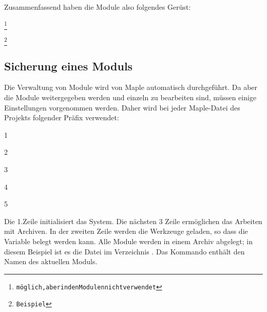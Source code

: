 Zusammenfassend haben die Module also folgendes Gerüst:
 
\begin{alltt} 
 	
 		
 		
     \footnote{möglich, aber in den Modulen nicht verwendet}
 	           
 		

    
     \footnote{Beispiel }
 		


		
		
 		
\end{alltt}


\newpage
\subsection{Sicherung eines Moduls}

Die Verwaltung von Module wird von Maple automatisch durchgeführt. Da aber die Module weitergegeben werden und einzeln zu bearbeiten sind, müssen einige  Einstellungen vorgenommen werden. Daher wird bei jeder Maple-Datei des Projekts folgender Präfix verwendet:

1 

2 

3 

4 

5 


Die 1.Zeile initialisiert das System. Die nächsten 3 Zeile ermöglichen das Arbeiten mit Archiven. In der zweiten Zeile werden die Werkzeuge geladen, so dass die Variable  belegt werden kann. Alle Module werden in einem Archiv abgelegt; in diesem Beispiel ist es die Datei  im Verzeichnis . Das Kommando  enthält den Namen des aktuellen Moduls. 

